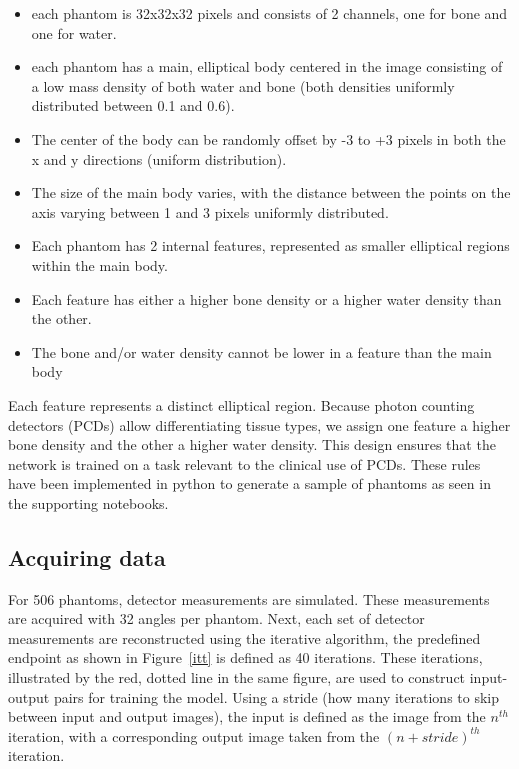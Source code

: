 \documentclass{article}
\begin{document}
\begin{itemize}
\item each phantom is 32x32x32 pixels and consists of 2 channels, one for bone and one for water.
\item each phantom has a main, elliptical body centered in the image consisting of a low mass density of both water and bone (both densities uniformly distributed between 0.1 and 0.6).
\item The center of the body can be randomly offset by -3 to +3 pixels in both the x and y directions (uniform distribution).
\item The size of the main body varies, with the distance between the points on the axis varying between 1 and 3 pixels uniformly distributed.
\item Each phantom has 2 internal features, represented as smaller elliptical regions within the main body.
\item Each feature has either a higher bone density or a higher water density than the other.
\item The bone and/or water density cannot be lower in a feature than the main body
\end{itemize}

Each feature represents a distinct elliptical region. Because photon counting detectors (PCDs) allow differentiating tissue types, we assign one feature a higher bone density and the other a higher water density. This design ensures that the network is trained on a task relevant to the clinical use of PCDs. These rules have been implemented in python to generate a sample of phantoms as seen in the supporting notebooks.

\subsection{Acquiring data}

For 506 phantoms, detector measurements are simulated. These measurements are acquired with 32 angles per phantom. Next, each set of detector measurements are reconstructed using the iterative algorithm, the predefined endpoint as shown in Figure~\ref{itt} is defined as 40 iterations. These iterations, illustrated by the red, dotted line in the same figure, are used to construct input-output pairs for training the model. Using a stride (how many iterations to skip between input and output images), the input is defined as the image from the $n^{th}$ iteration, with a corresponding output image taken from the $(n+stride)^{th}$ iteration.
\end{document}
